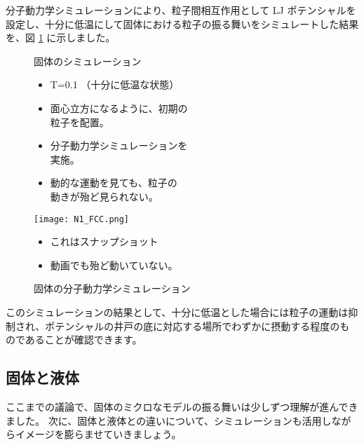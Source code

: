 \documentclass[uplatex,dvipdfmx,a4paper,11pt]{jsarticle}
\begin{document}
分子動力学シミュレーションにより、粒子間相互作用として LJ ポテンシャルを設定し、十分に低温にして固体における粒子の振る舞いをシミュレートした結果を、図 \ref{fig:MD-kotai} に示しました。

\begin{figure}[htb]
	\begin{center}
		\begin{minipage}{0.48\textwidth}
			\large
			\begin{itembox}[l]{固体のシミュレーション}
				\begin{itemize}
					\item T=0.1 （十分に低温な状態）
					\item 面心立方になるように、初期の\\粒子を配置。
					\item 分子動力学シミュレーションを\\実施。
					\item 動的な運動を見ても、粒子の\\動きが殆ど見られない。
				\end{itemize}
			\end{itembox}
		\end{minipage}
		\begin{minipage}{0.42\textwidth}
			\begin{center}
			\texttt{[image: N1\_FCC.png]}
			\large
			\begin{screen}
				\begin{itemize}
					\item これはスナップショット
					\item 動画でも殆ど動いていない。
				\end{itemize}
			\end{screen}
			\end{center}
		\end{minipage}
		\caption{固体の分子動力学シミュレーション}
		\label{fig:MD-kotai}
	\end{center}
\end{figure}

このシミュレーションの結果として、十分に低温とした場合には粒子の運動は抑制され、ポテンシャルの井戸の底に対応する場所でわずかに摂動する程度のものであることが確認できます。


\subsection{固体と液体}
ここまでの議論で、固体のミクロなモデルの振る舞いは少しずつ理解が進んできました。
次に、固体と液体との違いについて、シミュレーションも活用しながらイメージを膨らませていきましょう。
\end{document}
